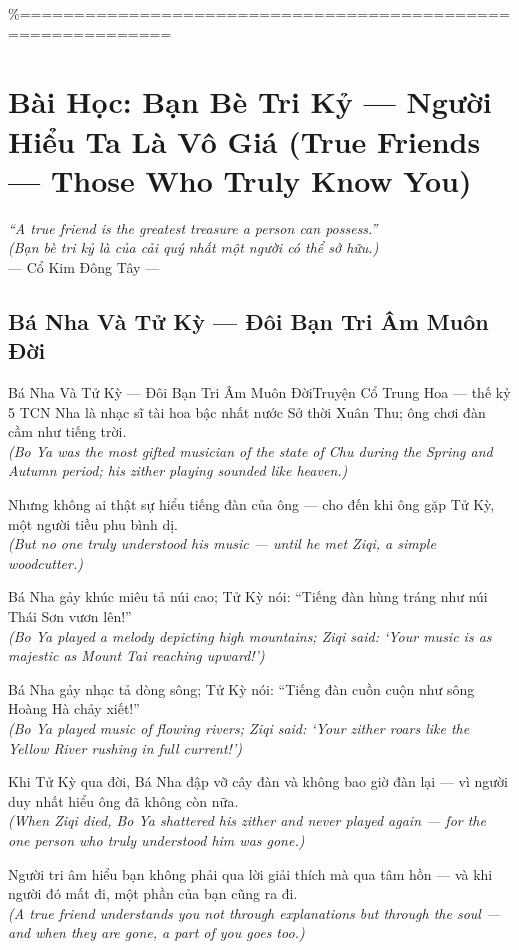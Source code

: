 \%============================================================
\chapter{Bài Học: Bạn Bè Tri Kỷ --- Người Hiểu Ta Là Vô Giá (True Friends --- Those Who Truly Know You)}
\begin{center}
  \textit{\color{truyengold}``A true friend is the greatest treasure a person can possess.''}\\[4pt]
  \textit{(Bạn bè tri kỷ là của cải quý nhất một người có thể sở hữu.)}\\[4pt]
  \small\color{truyenblue}--- Cổ Kim Đông Tây ---
\end{center}
\ngancach

\section{Bá Nha Và Tử Kỳ --- Đôi Bạn Tri Âm Muôn Đời}
\begin{truyen}{Bá Nha Và Tử Kỳ --- Đôi Bạn Tri Âm Muôn Đời}{Truyện Cổ Trung Hoa --- thế kỷ 5 TCN}
 Nha là nhạc sĩ tài hoa bậc nhất nước Sở thời Xuân Thu; ông chơi đàn cầm như tiếng trời.\\[4pt]
\textit{(Bo Ya was the most gifted musician of the state of Chu during the Spring and Autumn period; his zither playing sounded like heaven.)}

Nhưng không ai thật sự hiểu tiếng đàn của ông --- cho đến khi ông gặp Tử Kỳ, một người tiều phu bình dị.\\[4pt]
\textit{(But no one truly understood his music --- until he met Ziqi, a simple woodcutter.)}

Bá Nha gảy khúc miêu tả núi cao; Tử Kỳ nói: ``Tiếng đàn hùng tráng như núi Thái Sơn vươn lên!''\\[4pt]
\textit{(Bo Ya played a melody depicting high mountains; Ziqi said: `Your music is as majestic as Mount Tai reaching upward!')}

Bá Nha gảy nhạc tả dòng sông; Tử Kỳ nói: ``Tiếng đàn cuồn cuộn như sông Hoàng Hà chảy xiết!''\\[4pt]
\textit{(Bo Ya played music of flowing rivers; Ziqi said: `Your zither roars like the Yellow River rushing in full current!')}

Khi Tử Kỳ qua đời, Bá Nha đập vỡ cây đàn và không bao giờ đàn lại --- vì người duy nhất hiểu ông đã không còn nữa.\\[4pt]
\textit{(When Ziqi died, Bo Ya shattered his zither and never played again --- for the one person who truly understood him was gone.)}

\end{truyen}
\begin{baihoc}
  Người tri âm hiểu bạn không phải qua lời giải thích mà qua tâm hồn --- và khi người đó mất đi, một phần của bạn cũng ra đi.\\[4pt]
  \textit{(A true friend understands you not through explanations but through the soul --- and when they are gone, a part of you goes too.)}
\end{baihoc}

